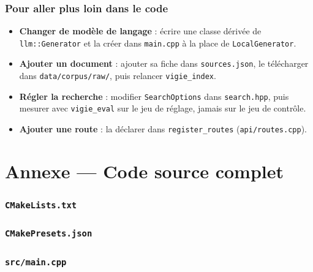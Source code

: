 \documentclass[11pt,a4paper]{article}
\newcommand{\fichier}[1]{\texttt{#1}}
\begin{document}
\section{Pour aller plus loin dans le code}

\begin{itemize}
  \item \textbf{Changer de modèle de langage} : écrire une classe dérivée de \texttt{llm::Generator} et la créer dans \fichier{main.cpp} à la place de \texttt{LocalGenerator}.
  \item \textbf{Ajouter un document} : ajouter sa fiche dans \fichier{sources.json}, le télécharger dans \fichier{data/corpus/raw/}, puis relancer \fichier{vigie\_index}.
  \item \textbf{Régler la recherche} : modifier \texttt{SearchOptions} dans \fichier{search.hpp}, puis mesurer avec \fichier{vigie\_eval} sur le jeu de réglage, jamais sur le jeu de contrôle.
  \item \textbf{Ajouter une route} : la déclarer dans \texttt{register\_routes} (\fichier{api/routes.cpp}).
\end{itemize}

\appendix
\part*{Annexe --- Code source complet}
\sloppy
\section*{\texttt{CMakeLists.txt}}


\section*{\texttt{CMakePresets.json}}


\section*{\texttt{src/main.cpp}}

\end{document}
